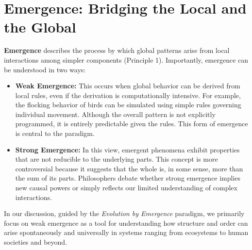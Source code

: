 \documentclass[12pt,openany]{book}
\begin{document}
\section*{Emergence: Bridging the Local and the Global}
\textbf{Emergence} describes the process by which global patterns arise from local interactions among simpler components (Principle 1). Importantly, emergence can be understood in two ways:
\begin{itemize}
    \item \textbf{Weak Emergence:} This occurs when global behavior can be derived from local rules, even if the derivation is computationally intensive. For example, the flocking behavior of birds can be simulated using simple rules governing individual movement. Although the overall pattern is not explicitly programmed, it is entirely predictable given the rules. This form of emergence is central to the paradigm.
    \item \textbf{Strong Emergence:} In this view, emergent phenomena exhibit properties that are not reducible to the underlying parts. This concept is more controversial because it suggests that the whole is, in some sense, more than the sum of its parts. Philosophers debate whether strong emergence implies new causal powers or simply reflects our limited understanding of complex interactions.
\end{itemize}
In our discussion, guided by the \emph{Evolution by Emergence} paradigm, we primarily focus on weak emergence as a tool for understanding how structure and order can arise spontaneously and universally in systems ranging from ecosystems to human societies and beyond. %
\end{document}
